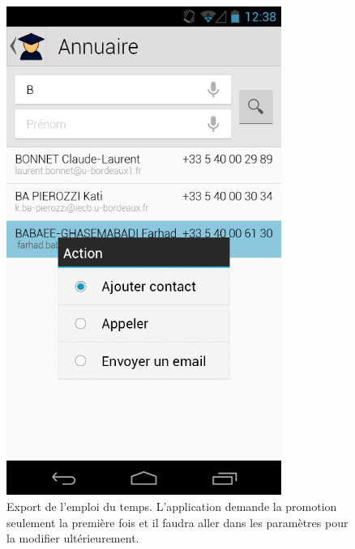 \documentclass [pdftex,12pt] {report}
\begin{document}
\begin{figure}
  \begin{minipage}[t]{8cm}
    \centering
    \includegraphics[width=0.8\textwidth]{resources/ui_preview/07}
    \caption{Export de l'emploi du temps. L'application demande la promotion seulement la première fois et il faudra aller dans les paramètres pour la modifier ultérieurement. }
    \label{fig:07}
  \end{minipage}
  \hspace{+20pt}
  \begin{minipage}[t]{8cm}
    \centering

\end{minipage}
\end{figure}
\end{document}
